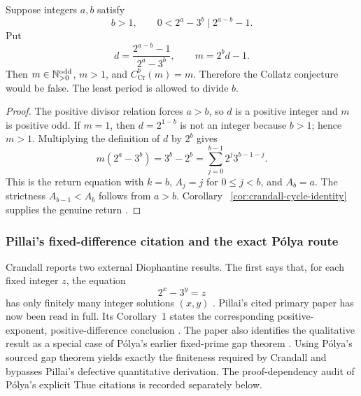 \begin{proposition}
\label{prop:Crandall-cycle-obstruction}
Suppose integers $a,b$ satisfy
\begin{equation}
\label{eq:Crandall-obstruction-hypothesis}
 b>1,
 \qquad
 0<2^a-3^b\mid 2^{a-b}-1.
\end{equation}
Put
\begin{equation}
\label{eq:Crandall-obstruction-construction}
 d=\frac{2^{a-b}-1}{2^a-3^b},
 \qquad
 m=2^bd-1.
\end{equation}
Then $m\in\mathbb{N}_{>0}^{\mathrm{odd}}$, $m>1$, and $C_{\mathrm{Cr}}^b(m)=m$.  Therefore the
Collatz conjecture would be false.  The least period is allowed to divide
$b$.
\end{proposition}

\begin{proof}
The positive divisor relation forces $a>b$, so $d$ is a positive integer and
$m$ is positive odd.  If $m=1$, then $d=2^{1-b}$ is not an integer because
$b>1$; hence $m>1$.  Multiplying the definition of $d$ by $2^b$ gives
\[
 m(2^a-3^b)=3^b-2^b
 =\sum_{j=0}^{b-1}2^j3^{b-1-j}.
\]
This is the return equation with $k=b$, $A_j=j$ for $0\leq j<b$, and
$A_b=a$.  The strictness $A_{b-1}<A_b$ follows from $a>b$.  Corollary~
\ref{cor:crandall-cycle-identity} supplies the genuine return
\cite[p.~1288]{Crandall1978}.
\end{proof}

\subsubsection{Pillai's fixed-difference citation and the exact P\'olya route}

Crandall reports two external Diophantine results.  The first says that, for
each fixed integer $z$, the equation
\begin{equation}
\label{eq:Crandall-fixed-difference}
 2^x-3^y=z
\end{equation}
has only finitely many integer solutions $(x,y)$
\cite[ref.~9 and p.~1288]{Crandall1978}.  Pillai's cited primary paper has now
been read in full.  Its Corollary~1 states the corresponding positive-
exponent, positive-difference conclusion
\cite[p.~4]{Pillai1931}.  The paper also identifies the qualitative result as
a special case of P\'olya's earlier fixed-prime gap theorem
\cite[p.~2]{Pillai1931}.  Using P\'olya's sourced gap theorem yields exactly
the finiteness required by Crandall and bypasses Pillai's defective
quantitative derivation.  The proof-dependency audit of P\'olya's explicit
Thue citations is recorded separately below.

